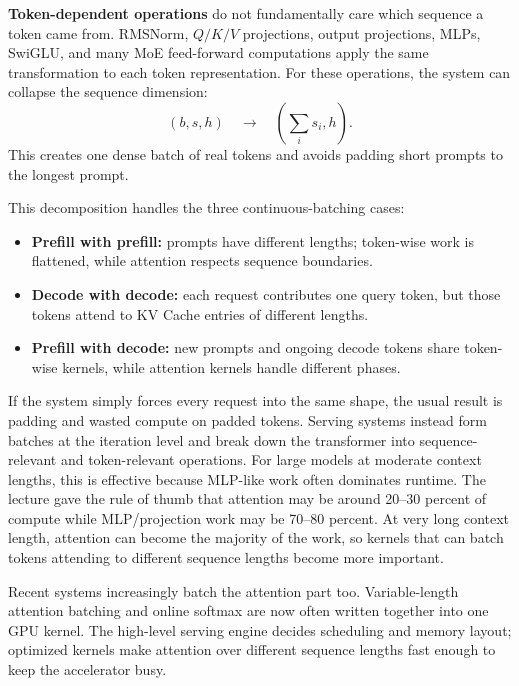 \documentclass[twoside]{article}
\begin{document}
\textbf{Token-dependent operations} do not fundamentally care which sequence a token came from.  RMSNorm, \(Q/K/V\) projections, output projections, MLPs, SwiGLU, and many MoE feed-forward computations apply the same transformation to each token representation.  For these operations, the system can collapse the sequence dimension:
\[
  (b, s, h) \quad \longrightarrow \quad
  \left(\sum_i s_i, h\right).
\]
This creates one dense batch of real tokens and avoids padding short prompts to the longest prompt.

This decomposition handles the three continuous-batching cases:
\begin{itemize}
  \item \textbf{Prefill with prefill:} prompts have different lengths; token-wise work is flattened, while attention respects sequence boundaries.
  \item \textbf{Decode with decode:} each request contributes one query token, but those tokens attend to KV Cache entries of different lengths.
  \item \textbf{Prefill with decode:} new prompts and ongoing decode tokens share token-wise kernels, while attention kernels handle different phases.
\end{itemize}

If the system simply forces every request into the same shape, the usual result is padding and wasted compute on padded tokens.  Serving systems instead form batches at the iteration level and break down the transformer into sequence-relevant and token-relevant operations.  For large models at moderate context lengths, this is effective because MLP-like work often dominates runtime.  The lecture gave the rule of thumb that attention may be around 20--30 percent of compute while MLP/projection work may be 70--80 percent.  At very long context length, attention can become the majority of the work, so kernels that can batch tokens attending to different sequence lengths become more important.

Recent systems increasingly batch the attention part too.  Variable-length attention batching and online softmax are now often written together into one GPU kernel.  The high-level serving engine decides scheduling and memory layout; optimized kernels make attention over different sequence lengths fast enough to keep the accelerator busy.
\end{document}
